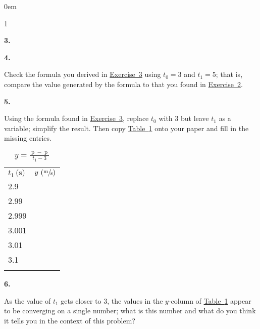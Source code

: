 \documentclass[12pt,]{book}
\theoremstyle{plain}
\theoremstyle{definition}
\numberwithin{equation}{section}
\newcommand{\hrulemedium}{\noalign{\hrule height 0.07em}}
\newcommand{\hrulethick} {\noalign{\hrule height 0.11em}}
\newcounter{figstack}
\newcounter{figindex}
\newlength\fight
\newcommand\pushValignCaptionBottom[5][b]{%
\stepcounter{figstack}%
\expandafter\def\csname %
figalign\romannumeral\value{figstack}\endcsname{#1}%
\expandafter\def\csname %
figtype\romannumeral\value{figstack}\endcsname{#2}%
\expandafter\def\csname %
figwd\romannumeral\value{figstack}\endcsname{#3}%
\expandafter\def\csname %
figcontent\romannumeral\value{figstack}\endcsname{#4}%
\expandafter\def\csname %
figcap\romannumeral\value{figstack}\endcsname{#5}%
\setbox0=\hbox{%
\begin{#2}{#3}#4\end{#2}}%
\ifdim\dimexpr\ht0+\dp0\relax>\fight\global\setlength{\fight}{%
\dimexpr\ht0+\dp0\relax}\fi%
}
\newcommand\popValignCaptionBottom{%
\setcounter{figindex}{0}%
\hfill%
\whiledo{\value{figindex}<\value{figstack}}{%
\stepcounter{figindex}%
\def\tmp{\csname figwd\romannumeral\value{figindex}\endcsname}%
\begin{\csname figtype\romannumeral\value{figindex}\endcsname}[t]{\tmp}%
\centering%
\stackinset{c}{}%
{\csname figalign\romannumeral\value{figindex}\endcsname}{}%
{\csname figcontent\romannumeral\value{figindex}\endcsname}%
{\rule{0pt}{\fight}}\par%
\csname figcap\romannumeral\value{figindex}\endcsname%
\end{\csname figtype\romannumeral\value{figindex}\endcsname}%
\hfill%
}%
\setcounter{figstack}{0}%
\setlength{\fight}{0pt}%
\hfill%
}
\newenvironment{exercisegroup}%
{\medskip\noindent}%
{\par\bigskip}%
\newlength{\exercisegroupindent}%
\newlength{\exercisegroupitemwidth}%
\newenvironment{exercisegrouplist}%
{\vspace{-\partopsep}%
\begin{adjustwidth}{\exercisegroupindent}{0em}}%
{\end{adjustwidth}%
\vspace{-\partopsep}%
\vspace{\baselineskip}}%
\newenvironment{exercisegroupbycol}[1]%
{\begin{exercisegrouplist}%
\vspace{-\multicolsep}%
\begin{multicols}{#1}%
\setlength{\parindent}{0em}%
\setlength{\exercisegroupitemwidth}{\linewidth}}%
{\end{multicols}%
\vspace{-\multicolsep}%
\end{exercisegrouplist}}%
\newenvironment{exercisegroupitem}[1]%
{\begin{minipage}[t]{\exercisegroupitemwidth}
\vspace{0pt}%
{\bfseries#1}%
\rule{0pt}{\baselineskip}}{\strut%
\end{minipage}%
\hspace{\columnsep}}%
\providecommand\phantomsection{}
\newcommand{\fe}[2]{\mathop{{#1}{\left(#2\right)}}}
\begin{document}
\begin{exercisegroup}
\begin{exercisegroupbycol}{1}
\begin{exercisegroupitem}{3. }
\end{exercisegroupitem}%
\par%
\begin{exercisegroupitem}{4. }\phantomsection\hypertarget{exercise-4}{\null}
Check the formula you derived in \hyperref[exercise-average-velocity-formula]{Exercise~3} using \(t_0=3\) and \(t_1=5\); that is, compare the value generated by the formula to that you found in \hyperref[exercise-average-velocity]{Exercise~2}.%
\end{exercisegroupitem}%
\par%
\begin{exercisegroupitem}{5. }\phantomsection\hypertarget{exercise-5}{\null}
Using the formula found in \hyperref[exercise-average-velocity-formula]{Exercise~3}, replace \(t_0\) with \(3\) but leave \(t_1\) as a variable; simplify the result. Then copy \hyperref[table-velocity]{Table~\ref*{table-velocity}} onto your paper and fill in the missing entries.%
\begin{table}
\centering
\caption{\(y=\frac{\fe{p}{t_1}-\fe{p}{3}}{t_1-3}\)\label{table-velocity}}
\begin{tabular}{lc}\hrulethick
\(t_1\,\text{(s)}\)&\(y\,\left(\sfrac{\text{m}}{\text{s}}\right)\)\\\hrulemedium
2.9&\\
2.99&\\
2.999&\\
3.001&\\
3.01&\\
3.1&\\\hrulethick
\end{tabular}
\end{table}
\end{exercisegroupitem}%
\par%
\begin{exercisegroupitem}{6. }\phantomsection\hypertarget{exercise-6}{\null}
As the value of \(t_1\) gets closer to \(3\), the values in the \(y\)-column of \hyperref[table-velocity]{Table~\ref*{table-velocity}} appear to be converging on a single number; what is this number and what do you think it tells you in the context of this problem?%
\end{exercisegroupitem}%
\par%
\end{exercisegroupbycol}%
\end{exercisegroup}%
\typeout{************************************************}
\typeout{************************************************}
\end{document}
